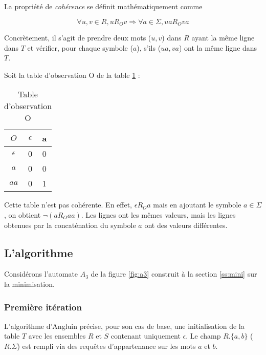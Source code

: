La propriété de \emph{cohérence} se définit mathématiquement comme

$$ \forall u,v \in R, u R_O v \Rightarrow \forall a \in \Sigma, ua R_O va$$

Concrètement, il s'agit de prendre deux mots ($u,v$) dans $R$ ayant la même ligne dans $T$ et vérifier, pour chaque symbole ($a$), s'ils ($ua,va$) ont la même ligne dans $T$.

\begin{example}
	Soit la table d'observation O de la table \ref{tab:Oex} :

	\begin{table}[H]
		\centering
	\begin{tabular}{|c|c|c|}
		\hline
		$O$ & $\epsilon$ & a\\
		\hline
		$\epsilon$ & 0 & 0\\
		$a$ & 0 & 0\\
		\hline
		$aa$ & 0 & 1\\
		\hline
	\end{tabular}\caption{Table d'observation O}\label{tab:Oex}
\end{table}
	\vspace{0.5cm}
	Cette table n'est pas cohérente. En effet, $\epsilon R_O a$ mais en ajoutant le symbole $a\in \Sigma$, on obtient $\neg (a R_O aa)$. Les lignes ont les mêmes valeurs, mais les lignes obtenues par la concaténation du symbole $a$ ont des valeurs différentes.
\end{example}



\subsection{L'algorithme}\label{ss:a_exemple}
Considérons l'automate $A_3$ de la figure \ref{fig:a3} construit à la section \ref{ss:mini} sur la minimisation.


\subsubsection{Première itération}

L'algorithme d'Angluin précise, pour son cas de base, une initialisation de la table $T$ avec les ensembles $R$ et $S$ contenant uniquement $\epsilon$. Le champ $R.\{a,b\}$ ($R.\Sigma$) est rempli via des requêtes d'appartenance sur les mots $a$ et $b$.

